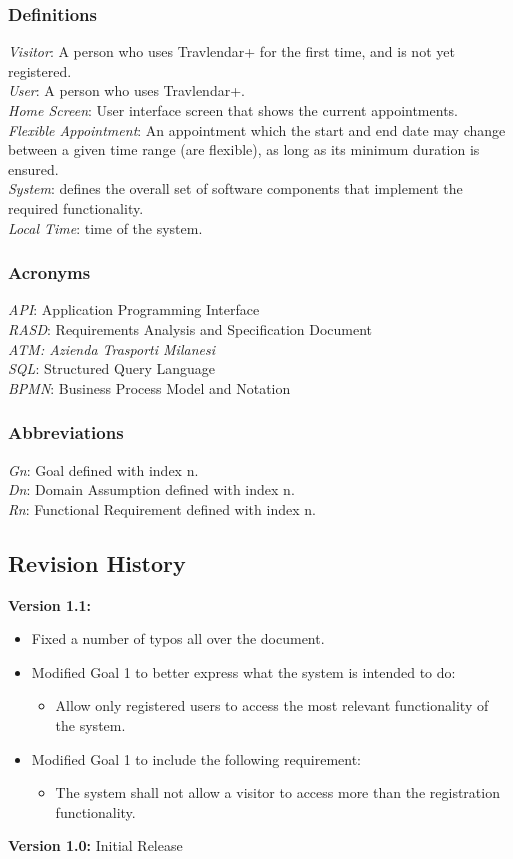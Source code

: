 \documentclass[12pt]{article}
\begin{document}
\subsubsection{Definitions}
\textit{Visitor}: A person who uses Travlendar+ for the first time, and is not yet registered.\\
\textit{User}: A person who uses Travlendar+.\\
\textit{Home Screen}: User interface screen that shows the current appointments.\\
\textit{Flexible Appointment}: An appointment which the start and end date may change between a given time range (are flexible), as long as its minimum duration is ensured.\\
\textit{System}: defines the overall set of software components that implement the required functionality.\\
\textit{Local Time}: time of the system.
\subsubsection{Acronyms}
\textit{API}: Application Programming Interface\\
\textit{RASD}: Requirements Analysis and Specification Document\\
\textit{ATM: Azienda Trasporti Milanesi}\\
\textit{SQL}: Structured Query Language\\
\textit{BPMN}: Business Process Model and Notation
\subsubsection{Abbreviations}
\textit{Gn}: Goal defined with index n.\\
\textit{Dn}: Domain Assumption defined with index n.\\
\textit{Rn}: Functional Requirement defined with index n.


\subsection{Revision History}
\textbf{Version 1.1:} 
\begin{itemize}
    \item Fixed a number of typos all over the document.
    \item Modified Goal 1 to better express what the system is intended to do: 
        \begin{itemize}
            \item Allow only registered users to access the most relevant functionality of the system.
        \end{itemize}
    \item Modified Goal 1 to include the following requirement:
        \begin{itemize}
            \item The system shall not allow a visitor to access more than the registration functionality.
        \end{itemize}
\end{itemize}
\textbf{Version 1.0:} Initial Release
\end{document}
